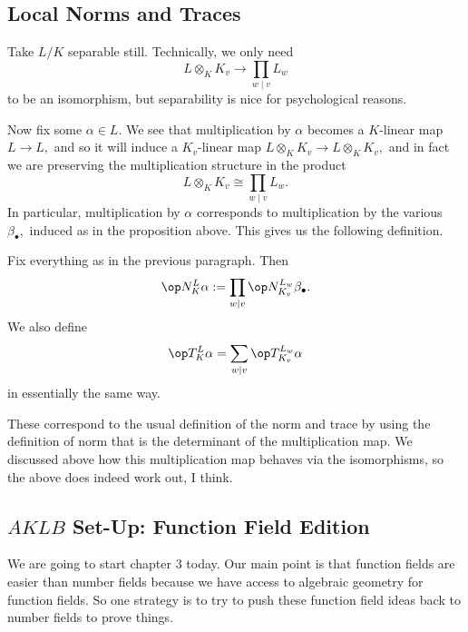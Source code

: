 \subsection{Local Norms and Traces}
Take $L/K$ separable still. Technically, we only need
\[L\otimes_KK_v\to\prod_{w\mid v}L_w\]
to be an isomorphism, but separability is nice for psychological reasons.

Now fix some $\alpha\in L.$ We see that multiplication by $\alpha$ becomes a $K$-linear map $L\to L,$ and so it will induce a $K_v$-linear map $L\otimes_KK_v\to L\otimes_KK_v,$ and in fact we are preserving the multiplication structure in the product
\[L\otimes_KK_v\cong\prod_{w\mid v}L_w.\]
In particular, multiplication by $\alpha$ corresponds to multiplication by the various $\beta_\bullet,$ induced as in the proposition above. This gives us the following definition.
\begin{definition}
	Fix everything as in the previous paragraph. Then
	\[\op N_K^L\alpha:=\prod_{w\mid v}\op N_{K_v}^{L_w}\beta_\bullet.\]
	We also define
	\[\op T_K^L\alpha=\sum_{w\mid v}\op T_{K_v}^{L_w}\alpha\]
	in essentially the same way.
\end{definition}
These correspond to the usual definition of the norm and trace by using the definition of norm that is the determinant of the multiplication map. We discussed above how this multiplication map behaves via the isomorphisms, so the above does indeed work out, I think.

\subsection{\texorpdfstring{$AKLB$}{AKLB} Set-Up: Function Field Edition}
We are going to start chapter 3 today. Our main point is that function fields are easier than number fields because we have access to algebraic geometry for function fields. So one strategy is to try to push these function field ideas back to number fields to prove things.

